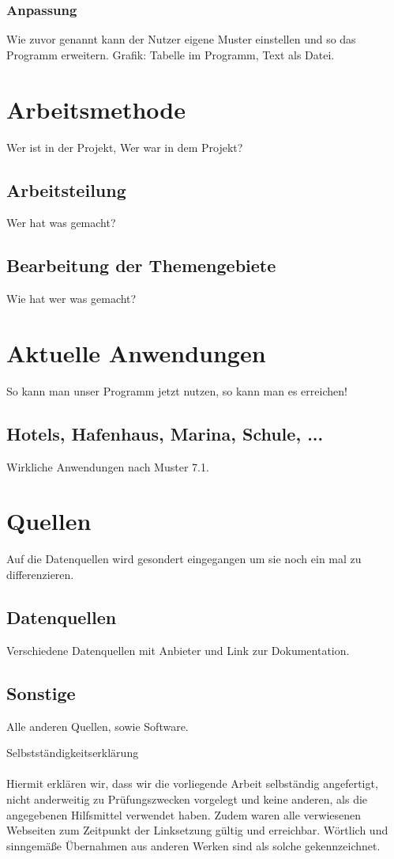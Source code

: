 \documentclass[a4paper,oneside,10pt,titlepage]{article}
\begin{document}
\subsubsection{Anpassung}
Wie zuvor genannt kann der Nutzer eigene Muster einstellen und so das Programm erweitern.
Grafik: Tabelle im Programm, Text als Datei.
\section{Arbeitsmethode}
Wer ist in der Projekt, Wer war in dem Projekt?
\subsection{Arbeitsteilung}
Wer hat was gemacht?
\subsection{Bearbeitung der Themengebiete}
Wie hat wer was gemacht?
\section{Aktuelle Anwendungen}
So kann man unser Programm jetzt nutzen, so kann man es erreichen!
\subsection{Hotels, Hafenhaus, Marina, Schule, ...}
Wirkliche Anwendungen nach Muster 7.1.
\section{Quellen}
Auf die Datenquellen wird gesondert eingegangen um sie noch ein mal zu differenzieren.
\subsection{Datenquellen}
Verschiedene Datenquellen mit Anbieter und Link zur Dokumentation.
\subsection{Sonstige}
Alle anderen Quellen, sowie Software.

\newpage
\Large{Selbstständigkeitserklärung}\\
\\
\small Hiermit erklären wir, dass wir die vorliegende Arbeit selbständig angefertigt, nicht anderweitig zu Prüfungszwecken vorgelegt und keine anderen, als die angegebenen Hilfsmittel verwendet haben. Zudem waren alle verwiesenen Webseiten zum Zeitpunkt der Linksetzung gültig und erreichbar. Wörtlich und sinngemäße Übernahmen aus anderen Werken sind als solche gekennzeichnet.
\\
\end{document}
